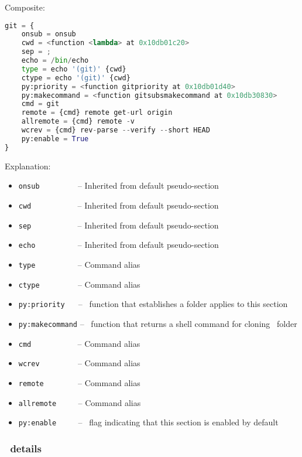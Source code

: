 Composite:

\begin{snugshade}
\begin{lstlisting}[language=python]
git = {
	onsub = onsub
	cwd = <function <lambda> at 0x10db01c20>
	sep = ;
	echo = /bin/echo
	type = echo '(git)' {cwd}
	ctype = echo '(git)' {cwd}
	py:priority = <function gitpriority at 0x10db01d40>
	py:makecommand = <function gitsubsmakecommand at 0x10db30830>
	cmd = git
	remote = {cmd} remote get-url origin
	allremote = {cmd} remote -v
	wcrev = {cmd} rev-parse --verify --short HEAD
	py:enable = True
}
\end{lstlisting}
\end{snugshade}

Explanation:

\begin{itemize}
\item \lstinline{onsub} ~~~~~~~~ -- Inherited from default pseudo-section
\item \lstinline{cwd} ~~~~~~~~~~ -- Inherited from default pseudo-section
\item \lstinline{sep} ~~~~~~~~~~ -- Inherited from default pseudo-section
\item \lstinline{echo} ~~~~~~~~~ -- Inherited from default pseudo-section
\item \lstinline{type} ~~~~~~~~~ -- Command alias
\item \lstinline{ctype} ~~~~~~~~ -- Command alias
\item \lstinline{py:priority} ~~ -- \Python\ function that establishes a folder applies to this section
\item \lstinline{py:makecommand} -- \Python\ function that returns a shell command for cloning \git\ folder
\item \lstinline{cmd} ~~~~~~~~~~ -- Command alias
\item \lstinline{wcrev} ~~~~~~~~ -- Command alias
\item \lstinline{remote} ~~~~~~~ -- Command alias
\item \lstinline{allremote} ~~~~ -- Command alias
\item \lstinline{py:enable} ~~~~ -- \Python\ flag indicating that this section is enabled by default
\end{itemize}

\subsubsection*{\git\ details}

